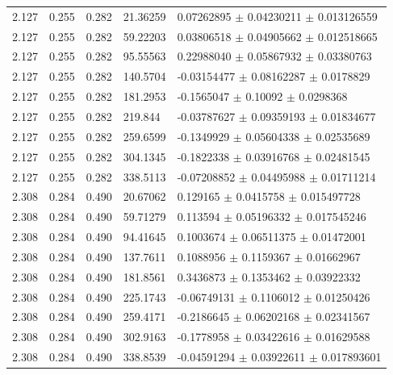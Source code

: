\begin{table}[!h]
\begin{center}
\begin{tabular}{||l|l|l|l|l||}
  2.127 & 0.255 & 0.282  &   21.36259  &  0.07262895   $\pm$ 0.04230211    $\pm$  0.013126559   \\
  2.127 & 0.255 & 0.282  &   59.22203  &  0.03806518   $\pm$ 0.04905662    $\pm$  0.012518665   \\
  2.127 & 0.255 & 0.282  &   95.55563  &  0.22988040   $\pm$ 0.05867932    $\pm$  0.03380763    \\
  2.127 & 0.255 & 0.282  &   140.5704  &  -0.03154477  $\pm$ 0.08162287    
 $\pm$  0.0178829     \\
  2.127 & 0.255 & 0.282  &   181.2953  &  -0.1565047   $\pm$ 0.10092       $\pm$  0.0298368     \\
  2.127 & 0.255 & 0.282  &   219.844   &  -0.03787627  $\pm$ 0.09359193    $\pm$  0.01834677    \\
  2.127 & 0.255 & 0.282  &   259.6599  &  -0.1349929   $\pm$ 0.05604338    $\pm$  0.02535689    \\
  2.127 & 0.255 & 0.282  &   304.1345  &  -0.1822338   $\pm$ 0.03916768    $\pm$  0.02481545    \\
  2.127 & 0.255 & 0.282  &   338.5113  &  -0.07208852  $\pm$ 0.04495988    $\pm$  0.01711214    \\
 \hline                                                                          
  2.308 & 0.284 & 0.490 &    20.67062  &  0.129165     $\pm$ 0.0415758     $\pm$  0.015497728  \\
  2.308 & 0.284 & 0.490 &    59.71279  &  0.113594     $\pm$ 0.05196332    $\pm$  0.017545246  \\
  2.308 & 0.284 & 0.490 &    94.41645  &  0.1003674    $\pm$ 0.06511375    $\pm$  0.01472001   \\
  2.308 & 0.284 & 0.490 &    137.7611  &  0.1088956    $\pm$ 0.1159367     $\pm$  0.01662967   \\
  2.308 & 0.284 & 0.490 &    181.8561  &  0.3436873    $\pm$ 0.1353462     $\pm$  0.03922332   \\
  2.308 & 0.284 & 0.490 &    225.1743  &  -0.06749131  $\pm$ 0.1106012     $\pm$  0.01250426   \\
  2.308 & 0.284 & 0.490 &    259.4171  &  -0.2186645   $\pm$ 0.06202168    $\pm$  0.02341567   \\
  2.308 & 0.284 & 0.490 &    302.9163  &  -0.1778958   $\pm$ 0.03422616    $\pm$  0.01629588   \\
  2.308 & 0.284 & 0.490 &    338.8539  &  -0.04591294  $\pm$ 0.03922611    $\pm$  0.017893601  \\
 \hline                         

\end{tabular}
\end{center}
\end{table}
